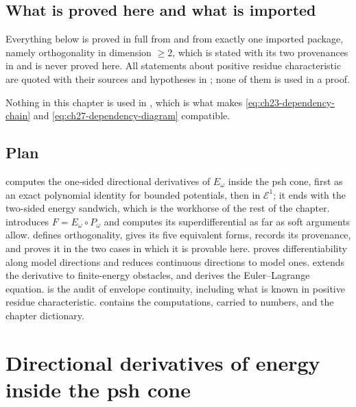 \subsection{What is proved here and what is imported}
\label{sec:ch27-imported}

Everything below is proved in full from
and from exactly one imported package, namely orthogonality in dimension
\(\geq2\), which is stated with its two provenances in
 and is never proved here.  All
statements about positive residue characteristic are quoted with their
sources and hypotheses in ; none of them is
used in a proof.

Nothing in this chapter is used in , which is what
makes \eqref{eq:ch23-dependency-chain} and
\eqref{eq:ch27-dependency-diagram} compatible.

\subsection{Plan}
\label{sec:ch27-plan}

 computes the one-sided directional derivatives
of \(E_\omega\) inside the psh cone, first as an exact polynomial identity
for bounded potentials, then in \(\mathcal E^1\); it ends with the two-sided
energy sandwich, which is the workhorse of the rest of the chapter.
 introduces \(F=E_\omega\circ P_\omega\)
and computes its superdifferential as far as soft arguments allow.
 defines orthogonality, gives its five
equivalent forms, records its provenance, and proves it in the two cases in
which it is provable here.   proves
differentiability along model directions and
 reduces continuous directions to model
ones.   extends the derivative to
finite-energy obstacles, and  derives the
Euler--Lagrange equation.   is the audit of
envelope continuity, including what is known in positive residue
characteristic.   contains the computations, carried
to numbers, and  the chapter dictionary.

\section{Directional derivatives of energy inside the psh cone}
\label{sec:ch27-directional}

